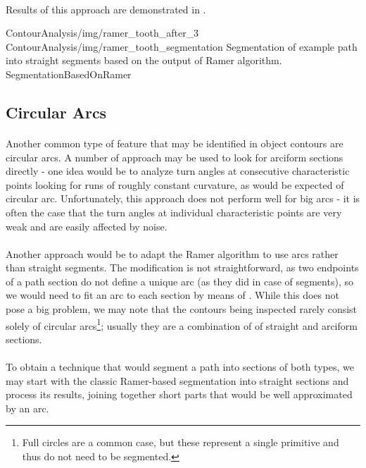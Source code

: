 \paragraph*{}
Results of this approach are demonstrated in .

\twoFigures
{ContourAnalysis/img/ramer_tooth_after_3}
{ContourAnalysis/img/ramer_tooth_segmentation}
{Segmentation of example path into straight segments based on the output of Ramer algorithm.}
{SegmentationBasedOnRamer}
{\basicWidth}

\subsection{Circular Arcs}

\paragraph*{}
Another common type of feature that may be identified in object contours are circular arcs. A number of approach may be used to look for arciform sections directly - one idea would be to analyze turn angles at consecutive characteristic points looking for runs of roughly constant curvature, as would be expected of circular arc. Unfortunately, this approach does not perform well for big arcs - it is often the case that the turn angles at individual characteristic points are very weak and are easily affected by noise.

\paragraph*{}
Another approach would be to adapt the Ramer algorithm to use arcs rather than straight segments. The modification is not straightforward, as two endpoints of a path section do not define a unique arc (as they did in case of segments), so we would need to fit an arc to each section by means of . While this does not pose a big problem, we may note that the contours being inspected rarely consist solely of circular arcs\footnote{Full circles are a common case, but these represent a single primitive and thus do not need to be segmented.}; usually they are a combination of of straight and arciform sections.

\paragraph*{}
To obtain a technique that would segment a path into sections of both types, we may start with the classic Ramer-based segmentation into straight sections and process its results, joining together short parts that would be well approximated by an arc.

